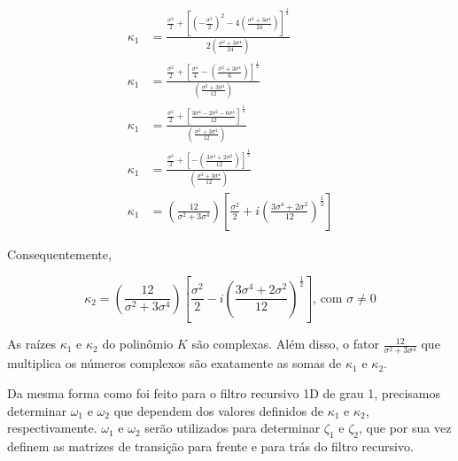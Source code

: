 
\begin{align}
\label{apV_eq:18}
\kappa_{1} & = \frac{ \frac{\sigma^{2}}{2} + \left[ \left( -\frac{\sigma^{2}}{2} \right)^2 -4 \left(  \frac{\sigma^{2} + 3\sigma^{4}}{24} \right) \right]^\frac{1}{2} }{2 \left( \frac{\sigma^{2} + 3\sigma^{4}}{24} \right)} \\
\label{apV_eq:19}
\kappa_{1} & = \frac{ \frac{\sigma^{2}}{2} + \left[ \frac{\sigma^{4}}{4} -\left(  \frac{\sigma^{2} + 3\sigma^{4}}{6} \right) \right]^\frac{1}{2} }{\left( \frac{\sigma^{2} + 3\sigma^{4}}{12} \right)} \\
\label{apV_eq:20}
\kappa_{1} & = \frac{ \frac{\sigma^{2}}{2} + \left[ \frac{3\sigma^{4} - 2\sigma^{2} - 6\sigma^{4}}{12} \right]^\frac{1}{2} }{\left( \frac{\sigma^{2} + 3\sigma^{4}}{12} \right)} \\
\label{apV_eq:21}
\kappa_{1} & = \frac{ \frac{\sigma^{2}}{2} + \left[ - \left( \frac{3\sigma^{4} + 2\sigma^{2}}{12} \right) \right]^\frac{1}{2} }{\left( \frac{\sigma^{2} + 3\sigma^{4}}{12} \right)} \\
\label{apV_eq:22}
\kappa_{1} & = \left( \frac{12}{\sigma^{2} + 3\sigma^{4}} \right) \left[ \frac{\sigma^{2}}{2} + i\left( \frac{3\sigma^{4} + 2\sigma^{2}}{12} \right)^\frac{1}{2} \right]
\end{align}

Consequentemente,

\begin{equation}
\label{apV_eq:23}
\kappa_{2} = \left( \frac{12}{\sigma^{2} + 3\sigma^{4}} \right) \left[ \frac{\sigma^{2}}{2} - i\left( \frac{3\sigma^{4} + 2\sigma^{2}}{12} \right)^\frac{1}{2} \right] \text{, com $\sigma \neq 0$}
\end{equation}

As raízes $\kappa_{1}$ e $\kappa_{2}$ do polinômio $K$ são complexas. Além disso, o fator $\frac{12}{\sigma^{2} + 3\sigma^{4}}$ que multiplica os números complexos são exatamente as somas de $\kappa_{1}$ e $\kappa_{2}$.

Da mesma forma como foi feito para o filtro recursivo 1D de grau 1, precisamos determinar $\omega_{1}$ e $\omega_{2}$ que dependem dos valores definidos de $\kappa_{1}$ e $\kappa_{2}$, respectivamente. $\omega_{1}$ e $\omega_{2}$ serão utilizados para determinar $\zeta_{1}$ e $\zeta_{2}$, que por sua vez definem as matrizes de transição para frente e para trás do filtro recursivo.

